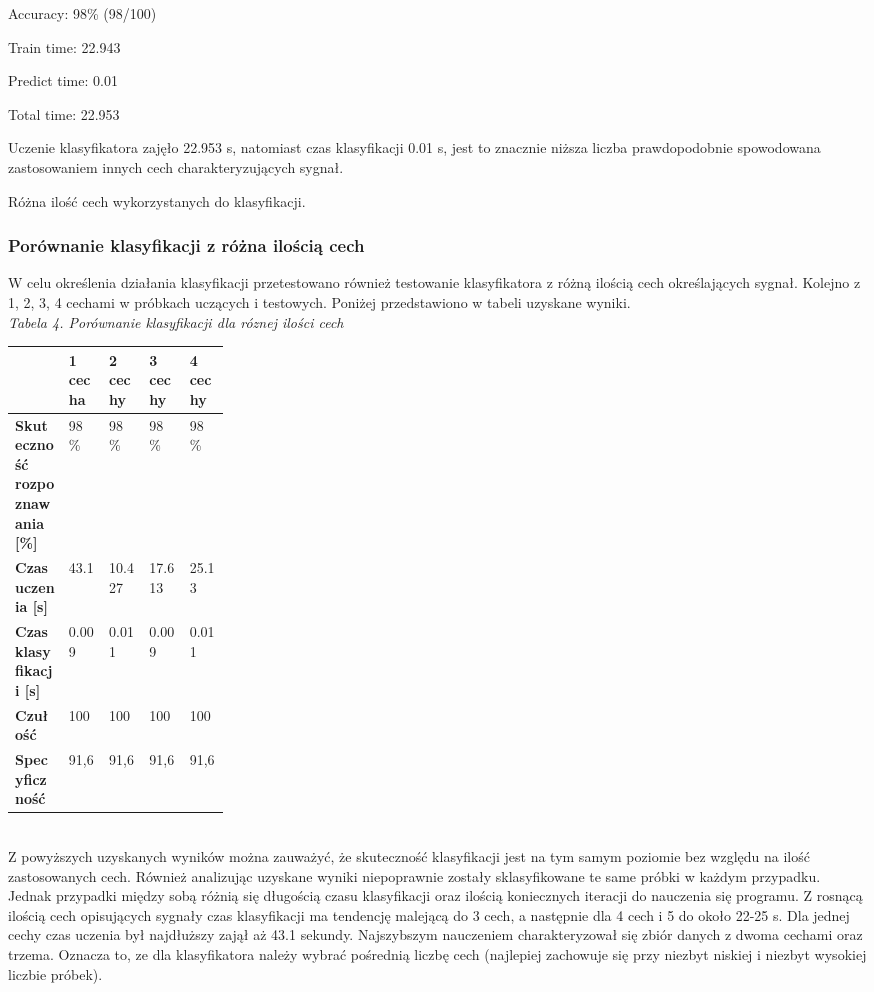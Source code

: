 \documentclass[[10pt,a4paper]{article}
\begin{document}
\begin{enumerate}
\noindent Accuracy: 98\% (98/100)

\noindent Train time:     22.943

\noindent Predict time:   0.01

\noindent Total time:     22.953

\noindent Uczenie klasyfikatora zajęło 22.953 s, natomiast czas klasyfikacji 0.01 s, jest to znacznie niższa liczba prawdopodobnie spowodowana zastosowaniem innych cech charakteryzujących sygnał. 

\noindent Różna ilość cech wykorzystanych do klasyfikacji.

\noindent 

\noindent 

\subsubsection{Porównanie klasyfikacji z różna ilością cech} 
\noindent W celu określenia działania klasyfikacji przetestowano również testowanie klasyfikatora z różną ilością cech określających sygnał. Kolejno z 1, 2, 3, 4 cechami w próbkach uczących i testowych. Poniżej przedstawiono w tabeli uzyskane wyniki.\\
\textit{ Tabela 4. Porównanie klasyfikacji dla róznej ilości cech}
\newline
\begin{tabular}{|p{0.25\linewidth}|p{0.8in}|p{0.8in}|p{0.8in}|p{0.8in}|} \hline 
 & \textbf{1 cecha} & \textbf{2 cechy} & \textbf{3 cechy} & \textbf{4 cechy} \\ \hline 
\textbf{Skuteczność rozpoznawania [\%]} & 98 \% & 98 \% & 98 \% & 98 \% \\ \hline 
\textbf{Czas uczenia [s]} & 43.1 & 10.427 & 17.613 & 25.13 \\ \hline 
\textbf{Czas klasyfikacji [s]} & 0.009 & 0.011 & 0.009 & 0.011 \\ \hline 
\textbf{Czułość} & 100 & 100 & 100 & 100 \\ \hline 
\textbf{Specyficzność} & 91,6 & 91,6 & 91,6 & 91,6 \\ \hline 
\end{tabular}\\



\noindent Z powyższych uzyskanych wyników można zauważyć, że skuteczność klasyfikacji jest na tym samym poziomie bez względu na ilość zastosowanych cech. Również analizując uzyskane wyniki niepoprawnie zostały sklasyfikowane te same próbki w każdym przypadku. Jednak przypadki między sobą różnią się długością czasu klasyfikacji oraz ilością koniecznych iteracji do nauczenia się programu. Z rosnącą ilością cech opisujących sygnały czas klasyfikacji ma tendencję malejącą do 3 cech, a następnie dla 4 cech i 5 do około 22-25 s. Dla jednej cechy czas uczenia był najdłuższy zajął aż 43.1 sekundy. Najszybszym nauczeniem charakteryzował się zbiór danych z dwoma cechami oraz trzema. Oznacza to, ze dla klasyfikatora należy wybrać pośrednią liczbę cech (najlepiej zachowuje się przy niezbyt niskiej i niezbyt wysokiej liczbie próbek). 


\end{enumerate}
\end{document}
